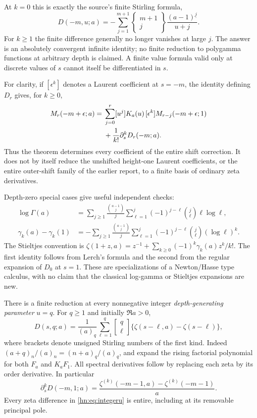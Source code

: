 At $k=0$ this is exactly the source's finite Stirling formula,
\[
 D(-m,u;a)=-\sum_{j=1}^{m+1}
       \left\{\begin{matrix}m+1\\j\end{matrix}\right\}
       \frac{(a-1)^{\underline j}}{u+j}.
\]
For $k\ge1$ the finite difference generally no longer vanishes at
large $j$. The answer is an absolutely convergent infinite identity;
no finite reduction to polygamma functions at arbitrary depth is
claimed. A finite value formula valid only at discrete values
of $s$ cannot itself be differentiated in $s$.

For clarity, if $[\epsilon^k]$ denotes a Laurent coefficient at
$s=-m$, the identity defining $D_r$ gives, for $k\ge0$,
\begin{align}
 [\epsilon^k]M_r(-m+\epsilon;a)
 ={}&\sum_{j=0}^r[u^j]K_a(u)\,
                 [\epsilon^k]M_{r-j}(-m+\epsilon;1)\notag\\
 &+\frac1{k!}\partial_s^kD_r(-m;a).
 \label{hn:eq:regular-reconstruction}
\end{align}
Thus the theorem determines every coefficient of the entire
shift correction. It does not by itself reduce the unshifted
height-one Laurent coefficients, or the entire outer-shift family
of the earlier report, to a finite basis of ordinary zeta derivatives.


Depth-zero special cases give useful independent checks:
\begin{align}
 \log\Gamma(a)
 &=\sum_{j\ge1}\frac{\binom{a-1}{j}}j
      \sum_{\ell=1}^j(-1)^{j-\ell}\binom j\ell\ell\log\ell,
 \label{hn:eq:loggamma}\\
 \gamma_k(a)-\gamma_k(1)
 &=-\sum_{j\ge1}\frac{\binom{a-1}{j}}j
      \sum_{\ell=1}^j(-1)^{j-\ell}\binom j\ell(\log\ell)^k.
 \label{hn:eq:Stieltjes-Newton}
\end{align}
The Stieltjes convention is
$\zeta(1+z,a)=z^{-1}+\sum_{k\ge0}(-1)^k\gamma_k(a)z^k/k!$.
The first identity follows from Lerch's formula \cite{DLMFHurwitz} and the second
from the regular expansion of $D_0$ at $s=1$. These are
specializations of a Newton/Hasse type calculus, with no claim
that the classical log-gamma or Stieltjes expansions are new.

There is a finite reduction at every nonnegative integer
\emph{depth-generating parameter} $u=q$. For $q\ge1$ and initially $\Re a>0$,
\begin{equation}\label{hn:eq:integeru}
 D(s,q;a)=\frac1{(a)_q}\sum_{\ell=1}^q
      \left[\begin{matrix}q\\\ell\end{matrix}\right]
            \{\zeta(s-\ell,a)-\zeta(s-\ell)\},
\end{equation}
where brackets denote unsigned Stirling numbers of the first kind.
Indeed $(a+q)_n/(a)_n=(n+a)_q/(a)_q$, and expand the rising
factorial polynomial for both $F_a$ and $K_aF_1$.
All spectral derivatives follow by replacing each zeta by its
order derivative. In particular
\[
 \partial_s^kD(-m,1;a)
   =\frac{\zeta^{(k)}(-m-1,a)-\zeta^{(k)}(-m-1)}a.
\]
Every zeta difference in \eqref{hn:eq:integeru} is entire,
including at its removable principal pole.


